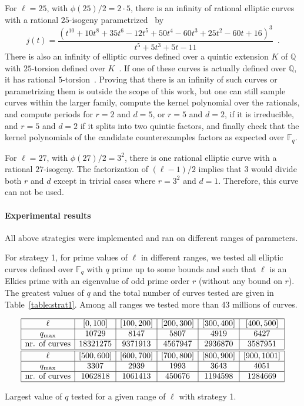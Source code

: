 \documentclass[12pt]{article}
\theoremstyle{plain}
\theoremstyle{definition}
\def\Q{\ensuremath{\mathbb{Q}}}
\def\F{\ensuremath{\mathbb{F}}}
\begin{document}
For $\ell = 25$, with $\phi(25)/2 = 2\cdot5$,
there is an infinity of rational elliptic curves
with a rational $25$-isogeny parametrized~\cite{Lozano-Robledo2013} by
\[
j(t) =
\frac{\left(t^{10}+10t^8+35t^6-12t^5+50t^4-60t^3+25t^2-60t+16\right)^3}
{t^5+5t^3+5t-11}\enspace .
\]
There is also an infinity of elliptic curves defined over a quintic
extension $K$ of $\Q$ with $25$-torsion defined over
$K$~\cite{Derickx201452,2016arXiv160807549D}.
If one of these curves is actually defined over $\Q$,
it has rational $5$-torsion~\cite{gonzalez-jimenez_complete_2016}.
Proving that there is an infinity of such curves or
parametrizing them is outside the scope of this work,
but one can still sample curves within the larger family,
compute the kernel polynomial over the rationals,
and compute periods for $r = 2$ and $d = 5$, or $r = 5$ and $d = 2$,
if it is irreducible,
and $r = 5$ and $d = 2$ if it splits into two quintic factors,
and finally check that the kernel polynomials of the candidate counterexamples
factors as expected over $\F_q$.

For $\ell = 27$, with $\phi(27)/2 = 3^2$,
there is one rational elliptic curve with a rational $27$-isogeny.
The factorization of $(\ell-1)/2$ implies
that $3$ would divide both $r$ and $d$
except in trivial cases where $r = 3^2$ and $d = 1$.
Therefore, this curve can not be used.

\paragraph{Experimental results}
All above strategies were implemented and ran on different ranges of parameters.

For strategy 1, for prime values of $\ell$ in different ranges,
we tested all elliptic curves defined over $\F_q$
with $q$ prime up to some bounds
and such that $\ell$ is an Elkies prime with an eigenvalue
of odd prime order $r$ (without any bound on $r$).
The greatest values of $q$ and the total number of curves tested
are given in Table~\ref{table:strat1}.
Among all ranges we tested more than 43 millions of curves.
\begin{table}[!ht]
\[
\begin{array}{|*{6}{c|}}
\hline
\ell & [0, 100] & [100, 200] & [200, 300] & [300, 400] & [400, 500] \\
\hline
q_{\max} & 10729 & 8147 & 5807 & 4919 & 6427 \\
\hline
\text{nr. of curves} & 18321275 & 9371913 & 4567947 & 2936870 & 3587951 \\
\hline
\hline
\ell & [500, 600] & [600, 700] & [700, 800] & [800, 900] & [900, 1001] \\
\hline
q_{\max} & 3307 & 2939 & 1993 & 3643 & 4051 \\
\hline
\text{nr. of curves} & 1062818 & 1061413 & 450676 & 1194598 & 1284669 \\
\hline
\end{array}
\]
\caption{Largest value of $q$ tested for a given range of $\ell$ with strategy 1.}
\label{table:strat1}
\end{table}
\end{document}
